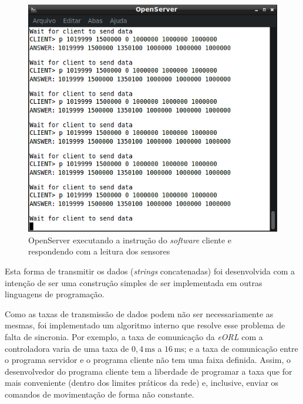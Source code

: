         \begin{figure}[ht]
            \centering
            \includegraphics[width=\columnwidth]{imagens/Softwares/openserver-send_.png}
            \small 
            \centering 
            \caption{OpenServer executando a instrução do \textit{software} cliente e respondendo com a leitura dos sensores}
            \label{openserver-send}
        \end{figure}
        
        Esta forma de transmitir os dados (\textit{strings} concatenadas) foi desenvolvida com a intenção de ser uma construção simples de ser implementada em outras linguagens de programação.

        Como as taxas de transmissão de dados podem não ser necessariamente as mesmas, foi implementado um algoritmo interno que resolve esse problema de falta de sincronia. Por exemplo, a taxa de comunicação da \textit{eORL} com a controladora varia de uma taxa de $0,4\,\mathrm{ms}$ a $16\,\mathrm{ms}$; e a taxa de comunicação entre o programa servidor e o programa cliente não tem uma faixa definida. Assim, o desenvolvedor do programa cliente tem a liberdade de programar a taxa que for mais conveniente (dentro dos limites práticos da rede) e, inclusive, enviar os comandos de movimentação de forma não constante.
        